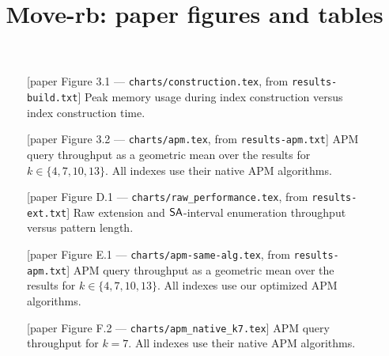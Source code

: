 \documentclass[letterpaper,10pt,twocolumn]{article}
\title{Move-rb: paper figures and tables}
\date{}
\begin{document}
\maketitle

\begin{table}[t]
\centering

\caption{\textup{[paper Table 3.1 --- \texttt{tables/texts.tex}, from \texttt{results-ext.txt}
and \texttt{results-apm.txt}]} Sizes and compression rates ($n / r$ and $n / \bwd{r}$) of the
tested texts, and sizes of the tested indexes.}
\label{tab:texts}
\end{table}

\begin{figure}[t]
\centering

\caption{\textup{[paper Figure 3.1 --- \texttt{charts/construction.tex}, from
\texttt{results-build.txt}]} Peak memory usage during index construction versus index
construction time.}
\label{fig:construction-memory-usage}
\end{figure}

\begin{figure}[t]
\centering

\caption{\textup{[paper Figure 3.2 --- \texttt{charts/apm.tex}, from
\texttt{results-apm.txt}]} APM query throughput as a geometric mean over the results for
$k \in \{4, 7, 10, 13\}$. All indexes use their native APM algorithms.}
\label{fig:apm}
\end{figure}



\begin{figure}[t]
\centering

\caption{\textup{[paper Figure D.1 --- \texttt{charts/raw\_performance.tex}, from
\texttt{results-ext.txt}]} Raw extension and $\mathsf{SA}$-interval enumeration throughput versus
pattern length.}
\label{fig:raw_performance}
\end{figure}

\begin{figure}[t]
\centering

\caption{\textup{[paper Figure E.1 --- \texttt{charts/apm-same-alg.tex}, from
\texttt{results-apm.txt}]} APM query throughput as a geometric mean over the results for
$k \in \{4, 7, 10, 13\}$. All indexes use our optimized APM algorithms.}
\label{fig:apm_same_alg}
\end{figure}

\begin{figure}[p]
\centering

\caption{\textup{[paper Figure F.1 --- \texttt{charts/apm\_native\_k4.tex}]} APM query
throughput for $k = 4$. All indexes use their native APM algorithms.}
\label{fig:apm_native_k4}


\caption{\textup{[paper Figure F.2 --- \texttt{charts/apm\_native\_k7.tex}]} APM query
throughput for $k = 7$. All indexes use their native APM algorithms.}
\label{fig:apm_native_k7}
\end{figure}
\end{document}
